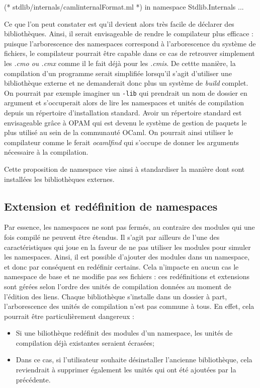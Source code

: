 \documentclass[11pt,a4paper]{report}
\begin{document}
\begin{OCaml}
(* stdlib/internals/camlinternalFormat.ml *)
in namespace Stdlib.Internals
...
\end{OCaml}

Ce que l'on peut constater est qu'il devient alors très facile de déclarer des
bibliothèques. Ainsi, il serait envisageable de rendre le compilateur plus
efficace : puisque l'arborescence des namespaces correspond à l'arborescence du
système de fichiers, le compilateur pourrait être capable dans ce cas de
retrouver simplement les \emph{.cmo ou .cmx} comme il le fait déjà pour les
\emph{.cmis}. De cettte manière, la compilation d'un programme serait simplifiée
lorsqu'il s'agit d'utiliser une bibliothèque externe et ne demanderait donc plus
un système de \emph{build} complet. On pourrait par exemple imaginer un
\texttt{-lib} qui prendrait un nom de dossier en argument et s'occuperait alors
de lire les namespaces et unités de compilation depuis un répertoire
d'installation standard. Avoir un répertoire standard est envisageable grâce à
OPAM qui est devenu le système de gestion de paquets le plus utilisé au sein de
la communauté OCaml. On pourrait ainsi utiliser le compilateur comme le ferait
\emph{ocamlfind} qui s'occupe de donner les arguments nécessaire à la compilation.

Cette proposition de namespace vise ainsi à standardiser la manière dont sont
installées les bibliothèques externes.

\subsection{Extension et redéfinition de namespaces}

Par essence, les namespaces ne sont pas fermés, au contraire des modules qui
une fois compilé ne peuvent être étendus. Il s'agit par ailleurs de l'une des
caractéristiques qui joue en la faveur de ne pas utiliser les modules pour
simuler les namespaces. Ainsi, il est possible d'ajouter des modules dans un
namespace, et donc par conséquent en redéfinir certains. Cela n'impacte en aucun
cas le namespace de base et ne modifie pas ses fichiers : ces redéfinitions et
extensions sont gérées selon l'ordre des unités de compilation données au moment
de l'édition des liens. Chaque bibliothèque s'installe dans un dossier à part,
l'arborescence des unités de compilation n'est pas commune à tous. En effet,
cela pourrait être particulièrement dangereux :
\begin{itemize}
\item Si une biliothèque redéfinit des modules d'un namespace, les unités de
  compilation déjà existantes seraient écrasées;
\item Dans ce cas, si l'utilisateur souhaite désinstaller l'ancienne
  bibliothèque, cela reviendrait à supprimer également les unités qui ont été
  ajoutées par la précédente.
\end{itemize}
\end{document}
